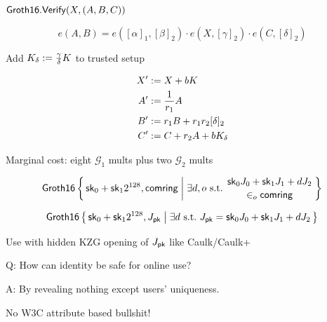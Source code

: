 \documentclass{beamer}
\def\comring{\ensuremath{\mathsf{comring}}\xspace}
\begin{document}
\begin{frame}
	
$\mathsf{Groth16}.{\mathsf{Verify}}(X,(A,B,C))$
	
$$ e(A,B) = e([\alpha]_1, [\beta]_2) \cdot e(X, [\gamma]_2) \cdot e(C, [\delta]_2) $$

\pause\medskip

Add $K_\delta := {\gamma\over\delta} K$ to trusted setup

$$ \begin{aligned}
X' &:= X + b K \\
A' &:= {1 \over r_1} A \\
B' &:= r_1 B + r_1 r_2 [\delta]_2 \\
C' &:= C + r_2 A + b K_\delta \\
\end{aligned} $$

\pause\bigskip\bigskip 

Marginal cost: eight $\mathcal{G}_1$ mults plus two $\mathcal{G}_2$ mults

\end{frame}



\begin{frame}

$$ \mathsf{Groth16} \Setst{ \sk_0 + \sk_1 2^{128}, \comring }{
    \exists d,o \textrm{\ s.t.\ }
	\genfrac{}{}{0pt}{}{ \sk_0 J_0 + \sk_1 J_1 + d J_2 }{ \in_o \comring }
} $$

\pause\bigskip\bigskip 


$$ \mathsf{Groth16} \Setst{ \sk_0 + \sk_1 2^{128}, J_\pk }{ 
	\exists d \textrm{\ s.t.\ }
	J_\pk = \sk_0 J_0 + \sk_1 J_1 + d J_2
} $$

\hspace{5pt} Use with hidden KZG opening of $J_\mathsf{pk}$ like Caulk/Caulk+

\end{frame}



\begin{frame} %
	
Q: How can identity be safe for online use?

\bigskip

A: By revealing nothing except users' uniqueness.

\bigskip\bigskip

No W3C attribute based bullshit!

\end{frame}
\end{document}
